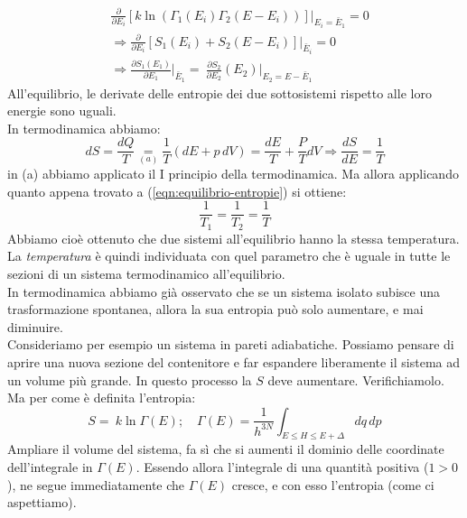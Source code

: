 \documentclass[12pt]{article}
\begin{document}
\begin{align}
&\frac{\partial}{\partial E_i}\left [k\ln(\Gamma_1(E_i)\Gamma_2(E-E_i))\right]\big|_{E_i = \bar{E}_1} = 0\nonumber \\
&\Rightarrow \frac{\partial}{\partial E_i}\left[S_1(E_i)+S_2(E-E_i)\right]\big|_{\bar{E}_i} = 0\nonumber \\
&\Rightarrow \frac{\partial S_1(E_1)}{\partial E_1}\big|_{\bar{E}_1} =\ \frac{\partial S_2}{\partial E_2}(E_2)\big|_{E_2=E-\bar{E}_1}
\label{eqn:equilibrio-entropie}
\end{align}
All'equilibrio, le derivate delle entropie dei due sottosistemi rispetto alle loro energie sono uguali.\\
In termodinamica abbiamo:
\[
dS = \frac{dQ}{T} \underset{(a)}{=} \frac{1}{T}(dE + p\,dV) =\frac{dE}{T}+\frac{P}{T}dV\Rightarrow \frac{dS}{dE} = \frac{1}{T}
\]
in (a) abbiamo applicato il I principio della termodinamica. Ma allora applicando quanto appena trovato a (\ref{eqn:equilibrio-entropie}) si ottiene:
\[
\frac{1}{T_1}=\frac{1}{T_2}=\frac{1}{T}
\]
Abbiamo cioè ottenuto che due sistemi all'equilibrio hanno la stessa temperatura.\\
La \textit{temperatura} è quindi individuata con quel parametro che è uguale in tutte le sezioni di un sistema termodinamico all'equilibrio.\\
In termodinamica abbiamo già osservato che se un sistema isolato subisce una trasformazione spontanea, allora la sua entropia può solo aumentare, e mai diminuire.\\
Consideriamo per esempio un sistema in pareti adiabatiche. Possiamo pensare di aprire una nuova sezione del contenitore e far espandere liberamente il sistema ad un volume più grande. In questo processo la $S$ deve aumentare. Verifichiamolo.\\
Ma per come è definita l'entropia:
\[
S =\ k\ln\Gamma(E); \quad \Gamma(E)=\frac{1}{h^{3N}}\int_{E\leq H \leq E+\Delta}dq\,dp
\]
Ampliare il volume del sistema, fa sì che si aumenti il dominio delle coordinate dell'integrale in $\Gamma(E)$. Essendo allora l'integrale di una quantità positiva ($1>0$), ne segue immediatamente che $\Gamma(E)$ cresce, e con esso l'entropia (come ci aspettiamo).
\end{document}

